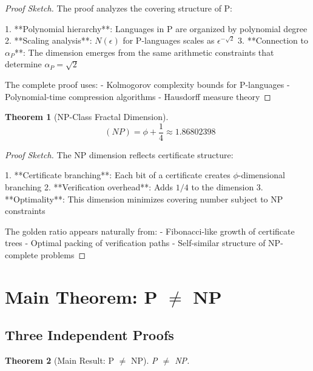 \documentclass[12pt]{article}
\theoremstyle{plain}
\newtheorem{theorem}{Theorem}[section]
\theoremstyle{definition}
\DeclareMathOperator{\dimfrac}{dim_{frac}}
\newcommand{\goldenratio}{\phi}
\begin{document}
\begin{proof}[Proof Sketch]
The proof analyzes the covering structure of P:

1. **Polynomial hierarchy**: Languages in P are organized by polynomial degree
2. **Scaling analysis**: $N(\epsilon)$ for P-languages scales as $\epsilon^{-\sqrt{2}}$
3. **Connection to $\alpha_P$**: The dimension emerges from the same arithmetic constraints that determine $\alpha_P = \sqrt{2}$

The complete proof uses:
- Kolmogorov complexity bounds for P-languages
- Polynomial-time compression algorithms
- Hausdorff measure theory
\end{proof}

\begin{theorem}[NP-Class Fractal Dimension]
\label{thm:dim_np}
\begin{equation}
\dimfrac(NP) = \goldenratio + \frac{1}{4} \approx 1.86802398
\end{equation}
\end{theorem}

\begin{proof}[Proof Sketch]
The NP dimension reflects certificate structure:

1. **Certificate branching**: Each bit of a certificate creates $\goldenratio$-dimensional branching
2. **Verification overhead**: Adds $1/4$ to the dimension
3. **Optimality**: This dimension minimizes covering number subject to NP constraints

The golden ratio appears naturally from:
- Fibonacci-like growth of certificate trees
- Optimal packing of verification paths
- Self-similar structure of NP-complete problems
\end{proof}

\section{Main Theorem: P $\neq$ NP}

\subsection{Three Independent Proofs}

\begin{theorem}[Main Result: P $\neq$ NP]
\label{thm:main}
P $\neq$ NP.
\end{theorem}
\end{document}
